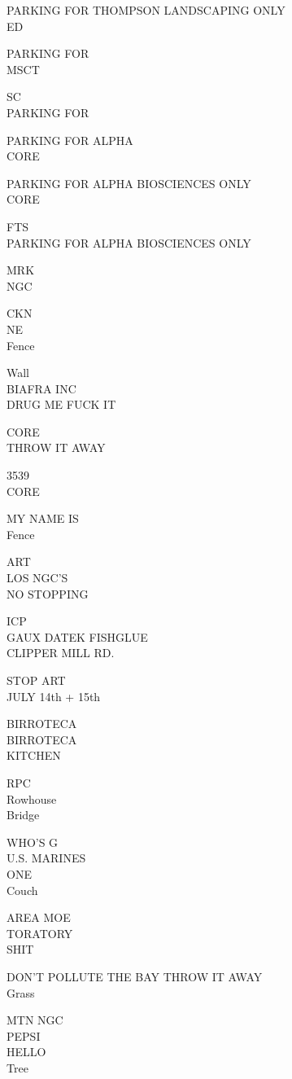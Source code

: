 \documentclass[10pt,letterpaper]{article}
\begin{document}
PARKING FOR THOMPSON LANDSCAPING ONLY\\
ED

PARKING FOR\\
MSCT

SC\\
PARKING FOR

PARKING FOR ALPHA\\
CORE

PARKING FOR ALPHA BIOSCIENCES ONLY\\
CORE

FTS\\
PARKING FOR ALPHA BIOSCIENCES ONLY

MRK\\
NGC

CKN\\
NE\\
Fence

Wall\\
BIAFRA INC\\
DRUG ME FUCK IT

CORE\\
THROW IT AWAY

3539\\
CORE

MY NAME IS\\
Fence

ART\\
LOS NGC'S\\
NO STOPPING

ICP\\
GAUX DATEK FISHGLUE\\
CLIPPER MILL RD.

STOP ART\\
JULY 14th + 15th

BIRROTECA\\
BIRROTECA\\
KITCHEN

RPC\\
Rowhouse\\
Bridge

WHO'S G\\
U.S. MARINES\\
ONE\\
Couch

AREA MOE\\
TORATORY\\
SHIT

DON'T POLLUTE THE BAY THROW IT AWAY\\
Grass

MTN NGC\\
PEPSI\\
HELLO\\
Tree
\end{document}
